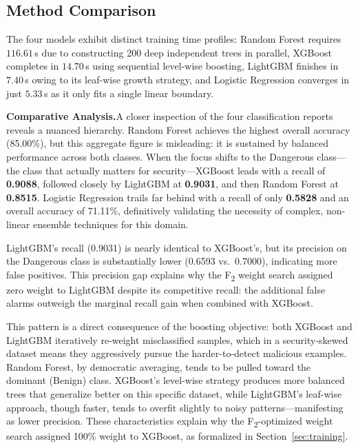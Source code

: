 \documentclass[12pt,a4paper]{article}
\begin{document}
\subsection{Method Comparison}
\noindent The four models exhibit distinct training time profiles: Random Forest requires $116.61$\,s due to constructing 200 deep independent trees in parallel, XGBoost completes in $14.70$\,s using sequential level-wise boosting, LightGBM finishes in $7.40$\,s owing to its leaf-wise growth strategy, and Logistic Regression converges in just $5.33$\,s as it only fits a single linear boundary.

\vspace{0.4cm}
\noindent\textbf{Comparative Analysis.}\quad A closer inspection of the four classification reports reveals a nuanced hierarchy. Random Forest achieves the highest overall accuracy (85.00\%), but this aggregate figure is misleading: it is sustained by balanced performance across both classes. When the focus shifts to the Dangerous class---the class that actually matters for security---XGBoost leads with a recall of \textbf{0.9088}, followed closely by LightGBM at \textbf{0.9031}, and then Random Forest at \textbf{0.8515}. Logistic Regression trails far behind with a recall of only \textbf{0.5828} and an overall accuracy of 71.11\%, definitively validating the necessity of complex, non-linear ensemble techniques for this domain.

LightGBM's recall (0.9031) is nearly identical to XGBoost's, but its precision on the Dangerous class is substantially lower (0.6593 vs.\ 0.7000), indicating more false positives. This precision gap explains why the F\textsubscript{2} weight search assigned zero weight to LightGBM despite its competitive recall: the additional false alarms outweigh the marginal recall gain when combined with XGBoost.

This pattern is a direct consequence of the boosting objective: both XGBoost and LightGBM iteratively re-weight misclassified samples, which in a security-skewed dataset means they aggressively pursue the harder-to-detect malicious examples. Random Forest, by democratic averaging, tends to be pulled toward the dominant (Benign) class. XGBoost's level-wise strategy produces more balanced trees that generalize better on this specific dataset, while LightGBM's leaf-wise approach, though faster, tends to overfit slightly to noisy patterns---manifesting as lower precision. These characteristics explain why the F\textsubscript{2}-optimized weight search assigned 100\% weight to XGBoost, as formalized in Section~\ref{sec:training}.
\end{document}
